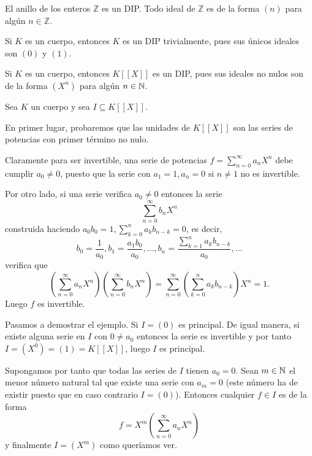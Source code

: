\begin{example}{}{}
El anillo de los enteros $\mathbb{Z}$ es un DIP. Todo ideal de $\mathbb{Z}$ es de la forma $(n)$ para algún $n \in \mathbb{Z}$.
\end{example}

\begin{example}{}{}
Si $K$ es un cuerpo, entonces $K$ es un DIP trivialmente, pues sus únicos ideales son $(0)$ y $(1)$.
\end{example}

\begin{example}{}{}
Si $K$ es un cuerpo, entonces $K[[X]]$ es un DIP, pues sus ideales no nulos son de la forma $(X^n)$ para algún $n \in \mathbb{N}$.
\end{example}

\begin{proofbox}
Sea $K$ un cuerpo y sea $I \subseteq K[[X]]$.

En primer lugar, probaremos que las unidades de $K[[X]]$ son las series de potencias con primer término no nulo.

\begin{proofbox}
    Claramente para ser invertible, una serie de potencias $f = \sum_{n=0}^{\infty} a_n X^n$ debe cumplir $a_0 \neq 0$, puesto que la serie con $a_1 = 1, a_n = 0 \text{ si }n \neq 1$ no es invertible.

    Por otro lado, si una serie verifica $a_0 \neq 0$ entonces la serie
    \[
    \sum_{n = 0}^{\infty} b_n X^n
    \]
    construida haciendo $a_0b_0 = 1, \sum_{k=0}^{n} a_k b_{n-k} = 0$, es decir,
    \[
    b_0 = \frac{1}{a_0}, b_1 = \frac{a_1 b_0}{a_0}, \dots, b_n = \frac{\sum_{k=1}^{n} a_k b_{n-k}}{a_0}, \dots
    \]
    verifica que
    \[
    (\sum_{n=0}^{\infty} a_n X^n)(\sum_{n = 0}^{\infty} b_n X^n) = \sum_{n = 0}^{\infty} \left( \sum_{k=0}^{n} a_k b_{n-k} \right) X^n = 1.
    \]
    Luego $f$ es invertible.
\end{proofbox}

Pasamos a demostrar el ejemplo. Si $I = (0)$ es principal. De igual manera, si existe alguna serie en $I$ con $0 \neq a_0$ entonces la serie es invertible y por tanto $I = (X^0) = (1) = K[[X]]$, luego $I$ es principal.

Supongamos por tanto que todas las series de $I$ tienen $a_0 = 0$. Sean $m \in \mathbb{N}$ el menor número natural tal que existe una serie con $a_m = 0$ (este número ha de existir puesto que en caso contrario $I = (0)$). Entonces cualquier $f \in I$ es de la forma
\[
f = X^m (\sum_{n=0}^{\infty} a_n X^n)
\]
y finalmente $I = (X^m)$ como queríamos ver.
\end{proofbox}


